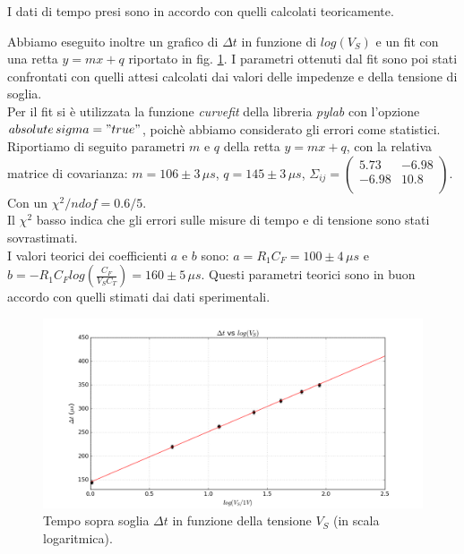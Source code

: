 \documentclass[10pt,a4paper]{article}
\begin{document}
I dati di tempo presi sono in accordo con quelli calcolati teoricamente.

Abbiamo eseguito inoltre un grafico di $\Delta t$ in funzione di $log(V_{S})$ e un fit con una retta $y = mx + q$ riportato in fig. \ref{retta}. I parametri ottenuti dal fit sono poi stati confrontati con quelli attesi calcolati dai valori delle impedenze e della tensione di soglia.\\
Per il fit si è utilizzata la funzione \emph{curvefit} della libreria \emph{pylab} con l'opzione \emph{$absolute\,sigma = "true"$}, poichè abbiamo considerato gli errori come statistici. Riportiamo di seguito parametri $m$ e $q$ della retta $y=mx+q$, con la relativa matrice di covarianza: $m = 106 \pm 3 \, \mu s $, $q = 145\pm 3 \, \mu s$,  $ \Sigma_{ij} = \left( \begin{array}{cc}
5.73 & -6.98 \\ 
-6.98 & 10.8\\
\end{array} \right)$. Con un $\chi^2/ndof = 0.6/5$.\\

Il $\chi^2$ basso indica che gli errori sulle misure di tempo e di tensione sono stati sovrastimati.\\

I valori teorici dei coefficienti $a$ e $b$ sono: $a = R_1 C_F = 100 \pm 4 \, \mu s$ e $b = - R_1 C_F log \left( \frac{C_F}{V_S C_T}\right) = 160 \pm 5 \, \mu s$. Questi parametri teorici sono in buon accordo con quelli stimati dai dati sperimentali.\\

\begin{figure}[htb!]
\centering
\includegraphics[scale=.5]{plot.png}
\caption{Tempo sopra soglia $\Delta t$ in funzione della tensione $V_S$ (in scala logaritmica).}
\label{retta}
\end{figure}
\end{document}
